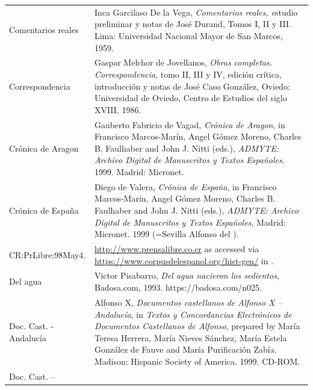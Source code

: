 \documentclass[output=paper]{langscibook}
\begin{document}
\begin{tabularx}{\textwidth}{XX}
Comentarios reales & Inca Garcilaso De la Vega, \emph{\textmd{\textit{Comentarios reales,}}\textmd{} \textmd{e}}studio preliminar y notas de José Durand, Tomos I, II y III. Lima: Universidad Nacional Mayor de San Marcos, 1959.\\
Correspondencia & Gaspar Melchor de Jovellanos, \textit{Obras completas. Correspondencia}, tomo II, III y IV, edición crítica, introducción y notas de José Caso González, Oviedo: Universidad de Oviedo, Centro de Estudios del siglo XVIII, 1986.\\
Crónica de Aragon & Gauberto Fabricio de Vagad, \textit{Crónica de Aragon}, in Francisco Marcos-Marín, Angel Gómez Moreno, Charles B. Faulhaber and John J. Nitti (eds.), \textit{ADMYTE: Archivo Digital de Manuscritos y Textos Españoles}. 1999. Madrid: Micronet. \\
Crónica de España & Diego de Valera, \textit{Crónica de España}, in Francisco Marcos-Marín, Angel Gómez Moreno, Charles B. Faulhaber and John J. Nitti (eds.), \textit{ADMYTE: Archivo Digital de Manuscritos y Textos Españoles}, Madrid: Micronet. 1999 (=Sevilla Alfonso del \citealt{Puerto1482}).\\
CR:PrLibre:98May4. & \url{http://www.prensalibre.co.cr} as accessed via \url{https://www.corpusdelespanol.org/hist-gen/} in \citealt{May2021}.\\
Del agua & Victor Pisabarro, \textit{Del agua nacieron los sedientos}, Badosa.com, 1993. https://badosa.com/n025.\\
Doc. Cast. - Andalucía & Alfonso X, \textit{Documentos castellanos de Alfonso X – Andalucía}, in \textit{Textos y Concordancias Electrónicos de Documentos Castellanos de Alfonso}, prepared by María Teresa Herrera, María Nieves Sánchez, María Estela González de Fauve and María Purificación Zabía. Madison: Hispanic Society of America. 1999. CD-ROM. \\
Doc. Cast. – 


\end{tabularx}
\end{document}
